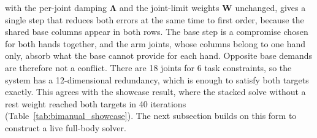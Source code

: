 \documentclass[12pt,a4paper]{article}
\begin{document}
\newpage
with the per-joint damping $\boldsymbol{\Lambda}$ and the joint-limit weights $\mathbf{W}$ unchanged, gives a single step that reduces both errors at the same time to first order, because the shared base columns appear in both rows. The base step is a compromise chosen for both hands together, and the arm joints, whose columns belong to one hand only, absorb what the base cannot provide for each hand. Opposite base demands are therefore not a conflict. There are 18 joints for 6 task constraints, so the system has a 12-dimensional redundancy, which is enough to satisfy both targets exactly. This agrees with the showcase result, where the stacked solve without a rest weight reached both targets in 40 iterations (Table~\ref{tab:bimanual_showcase}). The next subsection builds on this form to construct a live full-body solver.
\end{document}
